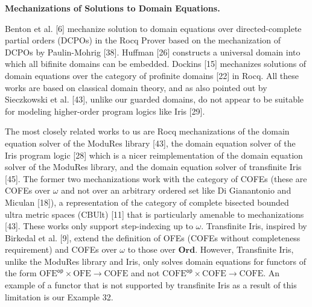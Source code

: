 \documentclass[10pt,a4paper]{article}
\begin{document}
\par\medskip\noindent\textbf{Mechanizations of Solutions to Domain Equations.}\par
 
 
Benton et al. [6] mechanize solution to domain equations over directed-complete partial orders (DCPOs) in the Rocq Prover based on the mechanization of DCPOs by Paulin-Mohrig [38]. Huffman [26] constructs a universal domain into which all bifinite domains can be embedded. Dockins [15] mechanizes solutions of domain equations over the category of profinite domains [22] in Rocq. All these works are based on classical domain theory, and as also pointed out by Sieczkowski et al. [43], unlike our guarded domains, do not appear to be suitable for modeling higher-order program logics like Iris [29].\par
 
 
 
The most closely related works to us are Rocq mechanizations of the domain equation solver of the ModuRes library [43], the domain equation solver of the Iris program logic [28] which is a nicer reimplementation of the domain equation solver of the ModuRes library, and the domain equation solver of transfinite Iris [45]. The former two mechanizations work with the category of COFEs (these are COFEs over $\omega$ and not over an arbitrary ordered set like Di Gianantonio and Miculan [18]), a representation of the category of complete bisected bounded ultra metric spaces (CBUlt) [11] that is particularly amenable to mechanizations [43]. These works only support step-indexing up to $\omega$. Transfinite Iris, inspired by Birkedal et al. [9], extend the definition of OFEs (COFEs without completeness requirement) and COFEs over $\omega$ to those over $\mathbf{Ord}$. However, Transfinite Iris, unlike the ModuRes library and Iris, only solves domain equations for functors of the form ${\mathrm{OFE}}^{\mathsf{op}}\times\mathrm{OFE}\to\mathrm{COFE}$ and not ${\mathrm{COFE}}^{\mathsf{op}}\times\mathrm{COFE}\to\mathrm{COFE}$. An example of a functor that is not supported by transfinite Iris as a result of this limitation is our Example 32.\par
 
 
 
 
\end{document}
